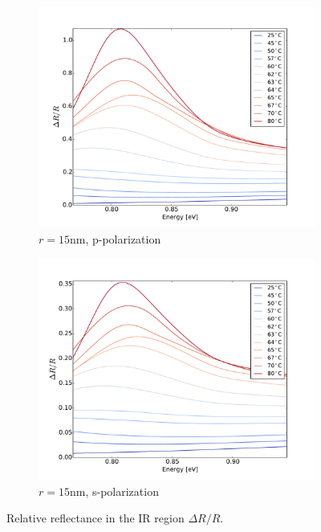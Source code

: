 \begin{figure}[h!]
\begin{subfigure}[b]{0.49\textwidth}
    \end{subfigure}
    \begin{subfigure}[b]{0.49\textwidth}
        \centering
        \includegraphics[width=\textwidth]{Results/Sim3/dR_lowE.pdf}
        \caption{$r=15$nm, p-polarization}
        \label{fig:dRlowE3}
    \end{subfigure}
    \begin{subfigure}[b]{0.49\textwidth}
        \centering
        \includegraphics[width=\textwidth]{Results/Sim4/dR_lowE.pdf}
        \caption{$r=15$nm, s-polarization}
        \label{fig:dRlowE4}
    \end{subfigure}
    \caption{Relative reflectance in the IR region $\Delta R/R$.}
    \label{fig:dRlowE}
\end{figure}
%

